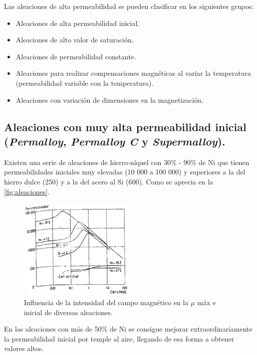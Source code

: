 \documentclass[12pt,a4paper]{article}
\begin{document}
Las aleaciones de alta permeabilidad se pueden clasificar en los siguientes grupos:

\begin{itemize}
    \item Aleaciones de alta permeabilidad inicial.
    \item Aleaciones de alto valor de saturación.
    \item Aleaciones de permeabilidad constante.
    \item Aleaciones para realizar compensaciones magnéticas al variar la temperatura (permeabilidad variable con la temperatura).
    \item Aleaciones con variación de dimensiones en la magnetización.
\end{itemize}

\subsection{Aleaciones con muy alta permeabilidad inicial (\textit{Permalloy}, \textit{Permalloy C} y \textit{Supermalloy}).}

Existen una serie de aleaciones de hierro-níquel con 30\% - 90\% de Ni que tienen permeabilidades iniciales muy elevadas (10 000 a 100 000) y superiores a la del hierro dulce (250) y a la del acero al Si (600). Como se aprecia en la \autoref{fig:aleaciones}.

\begin{figure}[t]    
    \centering         
    \includegraphics[width=0.5\textwidth]{IMAGENES LATEX/7.png}
    \caption{Influencia de la intensidad del campo magnético en la $\mu$ máx e inicial de diversas aleaciones.}
    \label{fig:aleaciones}
\end{figure}

En las aleaciones con más de 50\% de Ni se consigue mejorar extraordinariamente la permeabilidad inicial por temple al aire, llegando de esa forma a obtener valores altos. 
\end{document}
